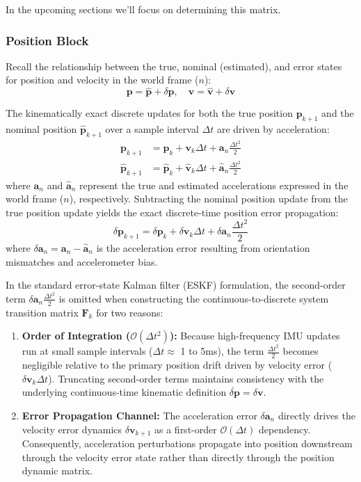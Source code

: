 \documentclass{article}
\begin{document}
	In the upcoming sections we'll focus on determining this matrix.
	

	\subsubsection{Position Block}
	Recall the relationship between the true, nominal (estimated), and error states for position and velocity in the world frame ($n$):
	\begin{equation*}
		\mathbf{p} = \hat{\mathbf{p}} + \delta\mathbf{p}, \quad \mathbf{v} = \hat{\mathbf{v}} + \delta\mathbf{v}
	\end{equation*}
	
	The kinematically exact discrete updates for both the true position $\mathbf{p}_{k+1}$ and the nominal position $\hat{\mathbf{p}}_{k+1}$ over a sample interval $\Delta t$ are driven by acceleration:
	\begin{align*}
		\mathbf{p}_{k+1} &= \mathbf{p}_k + \mathbf{v}_k \Delta t + \mathbf{a}_n \frac{\Delta t^2}{2} \\
		\hat{\mathbf{p}}_{k+1} &= \hat{\mathbf{p}}_k + \hat{\mathbf{v}}_k \Delta t + \hat{\mathbf{a}}_n \frac{\Delta t^2}{2}
	\end{align*}
	where $\mathbf{a}_n$ and $\hat{\mathbf{a}}_n$ represent the true and estimated accelerations expressed in the world frame ($n$), respectively. Subtracting the nominal position update from the true position update yields the exact discrete-time position error propagation:
	\begin{equation*}
		\delta\mathbf{p}_{k+1} = \delta\mathbf{p}_k + \delta\mathbf{v}_k \Delta t + \delta\mathbf{a}_n \frac{\Delta t^2}{2}
	\end{equation*}
	where $\delta\mathbf{a}_n = \mathbf{a}_n - \hat{\mathbf{a}}_n$ is the acceleration error resulting from orientation mismatches and accelerometer bias.
	
	In the standard error-state Kalman filter (ESKF) formulation, the second-order term $\delta\mathbf{a}_n \frac{\Delta t^2}{2}$ is omitted when constructing the continuous-to-discrete system transition matrix $\mathbf{F}_k$ for two reasons:
	\begin{enumerate}
		\item \textbf{Order of Integration ($\mathcal{O}(\Delta t^2)$):} Because high-frequency IMU updates run at small sample intervals ($\Delta t \approx$ 1 to 5ms), the term $\frac{\Delta t^2}{2}$ becomes negligible relative to the primary position drift driven by velocity error ($\delta\mathbf{v}_k \Delta t$). Truncating second-order terms maintains consistency with the underlying continuous-time kinematic definition $\dot{\delta\mathbf{p}} = \delta\mathbf{v}$.
		\item \textbf{Error Propagation Channel:} The acceleration error $\delta\mathbf{a}_n$ directly drives the velocity error dynamics $\delta\mathbf{v}_{k+1}$ as a first-order $\mathcal{O}(\Delta t)$ dependency. Consequently, acceleration perturbations propagate into position downstream through the velocity error state rather than directly through the position dynamic matrix.
	\end{enumerate}
	
\end{document}

